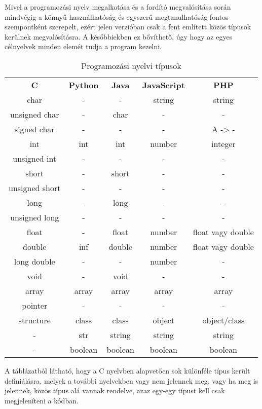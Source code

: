 Mivel a programozási nyelv megalkotása és a fordító megvalósítása során mindvégig a könnyű használhatóság és egyszerű megtanulhatóság fontos szempontként szerepelt, ezért jelen verzióban csak a fent említett közös típusok kerülnek megvalósításra. A későbbiekben ez bővíthető, úgy hogy az egyes célnyelvek minden elemét tudja a program kezelni.
\begin{table}
	\centering
	\begin{tabular}{c|c|c|c|c}
		\textbf{C} & \textbf{Python} & \textbf{Java} & \textbf{JavaScript} & \textbf{PHP}\\
		char & - & - & string & string \\
		unsigned char & - & char & - & - \\
		signed char & - & - & - & A -> - \\
		int & int & int & number & integer \\
		unsigned int & - & - & - & - \\
		short & - & short & - & - \\
		unsigned short & - & - & - & - \\
		long & - & long & - & - \\
		unsigned long & - & - & - & - \\
		float & - & float & number & float vagy double \\
		double & inf & double & number & float vagy double \\
		long double & - & - & number & - \\
		void & - & void & - & - \\
		array & array & array & array & array \\
		pointer & - & - & - & - \\
		structure & class & class & object & object/class \\
		- & str & string & string & string \\
		- & boolean & boolean & boolean & boolean \\
	\end{tabular}
	\caption{Programozási nyelvi típusok}
	\label{tab:lang_types}
\end{table}


A táblázatból látható, hogy a C nyelvben alapvetően sok különféle típus került definiálásra, melyek a további nyelvekben vagy nem jelennek meg, vagy ha meg is jelennek, közös típus alá vannak rendelve, azaz egy-egy típust kell csak megjeleníteni a kódban.

